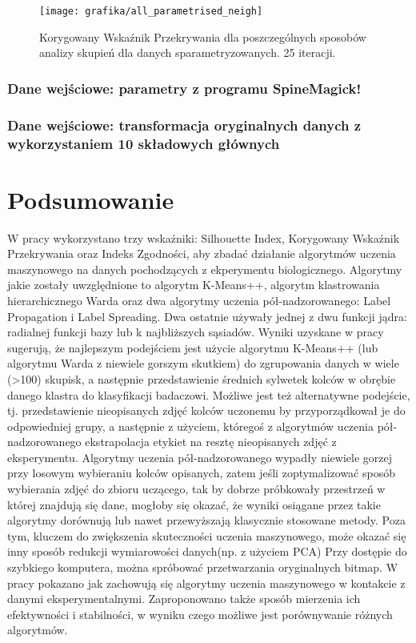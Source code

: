 \documentclass{article}
\begin{document}
\begin{figure}
\texttt{[image: grafika/all\_parametrised\_neigh]}
\caption{Korygowany Wskaźnik Przekrywania dla poszczególnych sposobów analizy skupień dla danych sparametryzowanych. 25 iteracji.}
\label{rysAllParamNeigh}

\end{figure}


\FloatBarrier
\subsubsection{Dane wejściowe: parametry z programu SpineMagick!}
\label{rozPorParametry}


\FloatBarrier
\subsubsection{Dane wejściowe: transformacja oryginalnych danych z wykorzystaniem 10 składowych głównych}
\label{rozPor10PCA}
\FloatBarrier
\section{Podsumowanie}
W pracy wykorzystano trzy wskaźniki: Silhouette Index, Korygowany Wskaźnik Przekrywania oraz Indeks Zgodności, aby zbadać działanie algorytmów uczenia maszynowego na danych pochodzących z ekperymentu biologicznego.
Algorytmy jakie zostały uwzględnione to algorytm K-Means++, algorytm klastrowania hierarchicznego Warda oraz dwa algorytmy uczenia pół-nadzorowanego: Label Propagation i Label Spreading. 
Dwa ostatnie używały jednej z dwu funkcji jądra: radialnej funkcji bazy lub k najbliższych sąsiadów.
Wyniki uzyskane w pracy sugerują, że najlepszym podejściem jest użycie algorytmu K-Means++ (lub algorytmu Warda z niewiele gorszym skutkiem) do zgrupowania danych w wiele (>100) skupisk, a następnie przedstawienie średnich sylwetek kolców w obrębie danego klastra do klasyfikacji badaczowi.
Możliwe jest też alternatywne podejście, tj. przedstawienie nieopisanych zdjęć kolców uczonemu by przyporządkował je do odpowiedniej grupy, a następnie z użyciem, któregoś z algorytmów uczenia pół-nadzorowanego ekstrapolacja etykiet na resztę nieopisanych zdjęć z eksperymentu.
Algorytmy uczenia pół-nadzorowanego wypadły niewiele gorzej przy losowym wybieraniu kolców opisanych, zatem jeśli zoptymalizować sposób wybierania zdjęć do zbioru uczącego, tak by dobrze próbkowały przestrzeń w której znajdują się dane, mogłoby się okazać, że wyniki osiągane przez takie algorytmy dorównują lub nawet przewyższają klasycznie stosowane metody.
Poza tym, kluczem do zwiększenia skuteczności uczenia maszynowego, może okazać się inny sposób redukcji wymiarowości danych(np. z użyciem PCA)
Przy dostępie do szybkiego komputera, można spróbować przetwarzania oryginalnych bitmap.
W pracy pokazano jak zachowują się algorytmy uczenia maszynowego w kontakcie z danymi eksperymentalnymi.
Zaproponowano także sposób mierzenia ich efektywności i stabilności, w wyniku czego możliwe jest porównywanie różnych algorytmów. 
\clearpage



\end{document}
